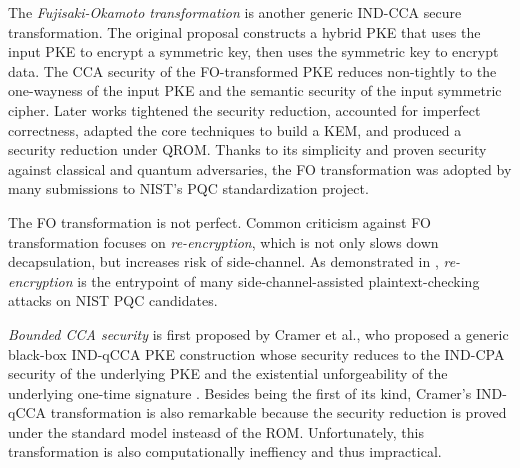 \documentclass[letterpaper,12pt,titlepage,oneside,final]{book}
\begin{document}
The \emph{Fujisaki-Okamoto transformation} \cite{DBLP:conf/crypto/FujisakiO99,DBLP:journals/joc/FujisakiO13} is another generic IND-CCA secure transformation.
The original proposal constructs a hybrid PKE that uses the input PKE to encrypt a symmetric key, then uses the symmetric key to encrypt data.
The CCA security of the FO-transformed PKE reduces non-tightly to the one-wayness of the input PKE and the semantic security of the input symmetric cipher.
Later works \cite{DBLP:conf/ima/Dent03,DBLP:conf/tcc/HofheinzHK17,DBLP:conf/eurocrypt/DworkNR04,DBLP:conf/asiacrypt/HovelmannsHM22} tightened the security reduction, accounted for imperfect correctness, adapted the core techniques to build a KEM, and produced a security reduction under QROM.
Thanks to its simplicity and proven security against classical and quantum adversaries, the FO transformation was adopted by many submissions to NIST's PQC standardization project.

The FO transformation is not perfect.
Common criticism against FO transformation focuses on \textit{re-encryption}, which is not only slows down decapsulation, but increases risk of side-channel.
As demonstrated in \cite{ueno2022curse,DBLP:journals/tches/TanakaUXITH23,ravi2019generic}, \textit{re-encryption} is the entrypoint of many side-channel-assisted plaintext-checking attacks on NIST PQC candidates.

\emph{Bounded CCA security} is first proposed by Cramer et al.\cite{DBLP:conf/asiacrypt/CramerHHIKPSV07}, who proposed a generic black-box IND-qCCA PKE construction whose security reduces to the IND-CPA security of the underlying PKE and the existential unforgeability of the underlying one-time signature \cite{lamport1979constructing}.
Besides being the first of its kind, Cramer's IND-qCCA transformation is also remarkable because the security reduction is proved under the standard model insteasd of the ROM.
Unfortunately, this transformation is also computationally ineffiency and thus impractical.
\end{document}
